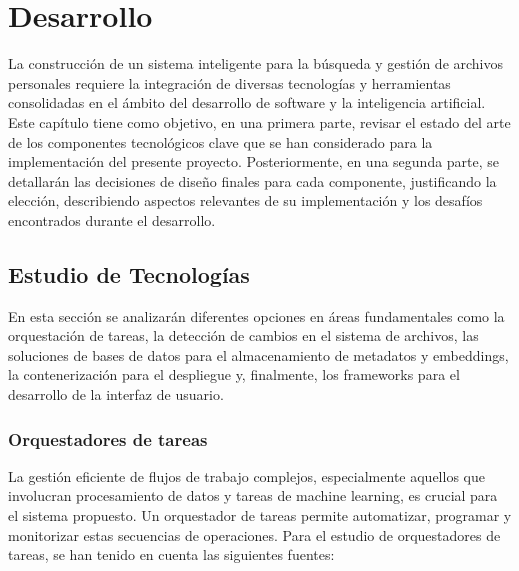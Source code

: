 
\chapter{Desarrollo}
\label{desarrollo}

La construcción de un sistema inteligente para la búsqueda y gestión de archivos personales requiere la integración de diversas tecnologías y herramientas consolidadas en el ámbito del desarrollo de software y la inteligencia artificial. Este capítulo tiene como objetivo, en una primera parte, revisar el estado del arte de los componentes tecnológicos clave que se han considerado para la implementación del presente proyecto. Posteriormente, en una segunda parte, se detallarán las decisiones de diseño finales para cada componente, justificando la elección, describiendo aspectos relevantes de su implementación y los desafíos encontrados durante el desarrollo.

\section{Estudio de Tecnologías}
\label{sec:estudio_tecnologias}
En esta sección se analizarán diferentes opciones en áreas fundamentales como la orquestación de tareas, la detección de cambios en el sistema de archivos, las soluciones de bases de datos para el almacenamiento de metadatos y embeddings, la contenerización para el despliegue y, finalmente, los frameworks para el desarrollo de la interfaz de usuario.

\subsection{Orquestadores de tareas}
La gestión eficiente de flujos de trabajo complejos, especialmente aquellos que involucran procesamiento de datos y tareas de machine learning, es crucial para el sistema propuesto. Un orquestador de tareas permite automatizar, programar y monitorizar estas secuencias de operaciones.
Para el estudio de orquestadores de tareas, se han tenido en cuenta las siguientes fuentes:
\cite{noauthor_best_2024}
\cite{suspicious_dress_350_airflow_2024}

